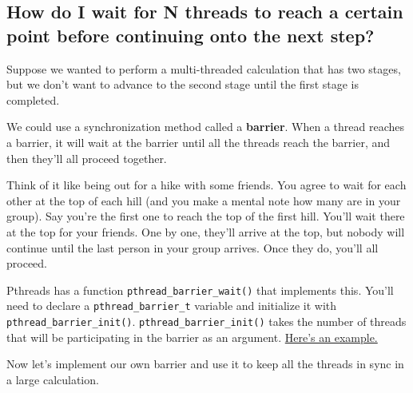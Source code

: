 \subsection{How do I wait for N threads to reach a certain point before
continuing onto the next
step?}\label{how-do-i-wait-for-n-threads-to-reach-a-certain-point-before-continuing-onto-the-next-step}

Suppose we wanted to perform a multi-threaded calculation that has two
stages, but we don't want to advance to the second stage until the first
stage is completed.

We could use a synchronization method called a \textbf{barrier}. When a
thread reaches a barrier, it will wait at the barrier until all the
threads reach the barrier, and then they'll all proceed together.

Think of it like being out for a hike with some friends. You agree to
wait for each other at the top of each hill (and you make a mental note
how many are in your group). Say you're the first one to reach the top
of the first hill. You'll wait there at the top for your friends. One by
one, they'll arrive at the top, but nobody will continue until the last
person in your group arrives. Once they do, you'll all proceed.

Pthreads has a function \texttt{pthread\_barrier\_wait()} that
implements this. You'll need to declare a \texttt{pthread\_barrier\_t}
variable and initialize it with \texttt{pthread\_barrier\_init()}.
\texttt{pthread\_barrier\_init()} takes the number of threads that will
be participating in the barrier as an argument.
\href{https://github.com/angrave/SystemProgramming/wiki/Sample-program-using-pthread-barriers}{Here's
an example.}

Now let's implement our own barrier and use it to keep all the threads
in sync in a large calculation.

\begin{Shaded}
\begin{Highlighting}[]
 \NormalTok{data[}\NormalTok{][}\NormalTok{]}

  

  

  
\end{Highlighting}
\end{Shaded}

